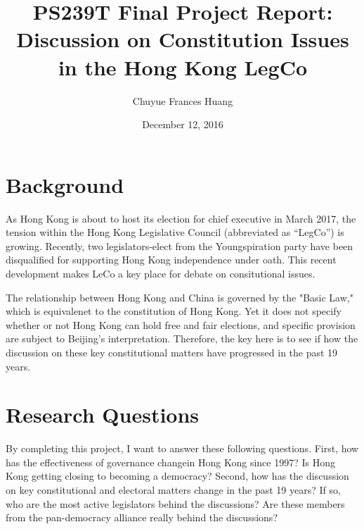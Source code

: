 \documentclass[11pt]{article}
\begin{document}
\title{PS239T Final Project Report: \\Discussion on Constitution Issues \\ in the Hong Kong LegCo}
\author{Chuyue Frances Huang}
\date{December 12, 2016}
\maketitle
\section*{Background}
As Hong Kong is about to host its election for chief executive in March 2017, the tension within the Hong Kong Legislative Council (abbreviated as “LegCo”) is growing. Recently, two legislators-elect from the Youngspiration party have been disqualified for supporting Hong Kong independence under oath. This recent development makes LeCo a key place for debate on consitutional issues. \par
The relationship between Hong Kong and China is governed by the "Basic Law," which is equivalenet to the constitution of Hong Kong. Yet it does not specify whether or not Hong Kong can hold free and fair elections, and specific provision are subject to Beijing's interpretation. Therefore, the key here is to see if how the discussion on these key constitutional matters have progressed in the past 19 years. 

\section*{Research Questions}
By completing this project, I want to answer these following questions. First, how has the effectiveness of governance changein Hong Kong since 1997? Is Hong Kong getting closing to becoming a democracy? Second, how has the discussion on key constitutional and electoral matters change in the past 19 years? If so, who are the most active legislators behind the discussions? Are these members from the pan-democracy alliance really behind the discussions? 
\end{document}
